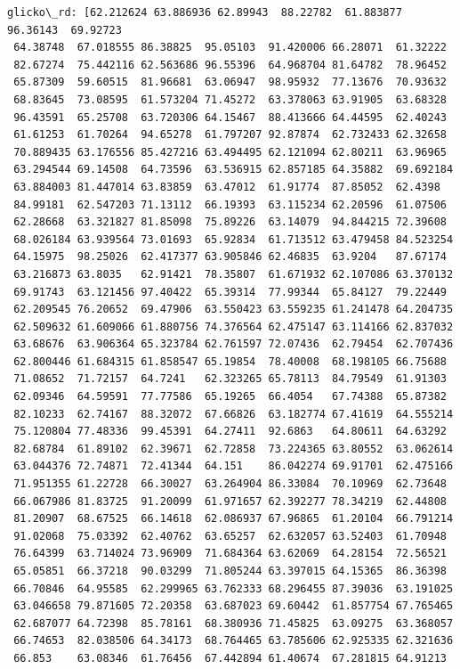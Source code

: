 \documentclass[11pt]{article}
\begin{document}
\begin{Verbatim}[commandchars=\\\{\}]
glicko\_rd: [62.212624 63.886936 62.89943  88.22782  61.883877 96.36143  69.92723
 64.38748  67.018555 86.38825  95.05103  91.420006 66.28071  61.32222
 82.67274  75.442116 62.563686 96.55396  64.968704 81.64782  78.96452
 65.87309  59.60515  81.96681  63.06947  98.95932  77.13676  70.93632
 68.83645  73.08595  61.573204 71.45272  63.378063 63.91905  63.68328
 96.43591  65.25708  63.720306 64.15467  88.413666 64.44595  62.40243
 61.61253  61.70264  94.65278  61.797207 92.87874  62.732433 62.32658
 70.889435 63.176556 85.427216 63.494495 62.121094 62.80211  63.96965
 63.294544 69.14508  64.73596  63.536915 62.857185 64.35882  69.692184
 63.884003 81.447014 63.83859  63.47012  61.91774  87.85052  62.4398
 84.99181  62.547203 71.13112  66.19393  63.115234 62.20596  61.07506
 62.28668  63.321827 81.85098  75.89226  63.14079  94.844215 72.39608
 68.026184 63.939564 73.01693  65.92834  61.713512 63.479458 84.523254
 64.15975  98.25026  62.417377 63.905846 62.46835  63.9204   87.67174
 63.216873 63.8035   62.91421  78.35807  61.671932 62.107086 63.370132
 69.91743  63.121456 97.40422  65.39314  77.99344  65.84127  79.22449
 62.209545 76.20652  69.47906  63.550423 63.559235 61.241478 64.204735
 62.509632 61.609066 61.880756 74.376564 62.475147 63.114166 62.837032
 63.68676  63.906364 65.323784 62.761597 72.07436  62.79454  62.707436
 62.800446 61.684315 61.858547 65.19854  78.40008  68.198105 66.75688
 71.08652  71.72157  64.7241   62.323265 65.78113  84.79549  61.91303
 62.09346  64.59591  77.77586  65.19265  66.4054   67.74388  65.87382
 82.10233  62.74167  88.32072  67.66826  63.182774 67.41619  64.555214
 75.120804 77.48336  99.45391  64.27411  92.6863   64.80611  64.63292
 82.68784  61.89102  62.39671  62.72858  73.224365 63.80552  63.062614
 63.044376 72.74871  72.41344  64.151    86.042274 69.91701  62.475166
 71.951355 61.22728  66.30027  63.264904 86.33084  70.10969  62.73648
 66.067986 81.83725  91.20099  61.971657 62.392277 78.34219  62.44808
 81.20907  68.67525  66.14618  62.086937 67.96865  61.20104  66.791214
 91.02068  75.03392  62.40762  63.65257  62.632057 63.52403  61.70948
 76.64399  63.714024 73.96909  71.684364 63.62069  64.28154  72.56521
 65.05851  66.37218  90.03299  71.805244 63.397015 64.15365  86.36398
 66.70846  64.95585  62.299965 63.762333 68.296455 87.39036  63.191025
 63.046658 79.871605 72.20358  63.687023 69.60442  61.857754 67.765465
 62.687077 64.72398  85.78161  68.380936 71.45825  63.09275  63.368057
 66.74653  82.038506 64.34173  68.764465 63.785606 62.925335 62.321636
 66.853    63.08346  61.76456  67.442894 61.40674  67.281815 64.91213

\end{Verbatim}
\end{document}
